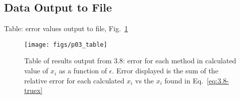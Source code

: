 \documentclass[paper=a4, fontsize=11pt]{scrartcl}
\numberwithin{equation}{section}		%
\numberwithin{figure}{section}			%
\numberwithin{table}{section}				%
\begin{document}
\vspace{4mm}
\subsection{Data Output to File}
Table: error values output to file, Fig.~\ref{fig:3.8}
\begin{center}
	\begin{figure}[!h]
		\texttt{[image: figs/p03\_table]}
		\caption{Table of results output from 3.8: error for each method in calculated value of $x_i$ as a function of $\epsilon$. Error displayed is the sum of the relative error for each calculated $x_i$ vs the $x_i$ found in Eq.~\ref{eq:3.8-truex} }
		\label{fig:3.8}
	\end{figure}
\end{center}

\vspace{4mm}
\end{document}
